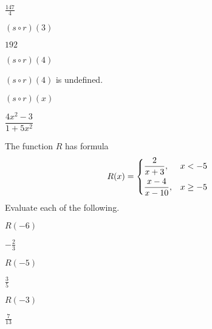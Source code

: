 \begin{exercises}
\begin{problem}[Composition]
\begin{multicols}{3}
\begin{subproblem}
 		\begin{shortsolution}
 			$\frac{147}{4}$ 
 		\end{shortsolution}
 	\end{subproblem}
 	\begin{subproblem}
 		$(s\circ r)(3)$ 
 		\begin{shortsolution}
 			$192$ 
 		\end{shortsolution}
 	\end{subproblem}
 	\begin{subproblem}
 		$(s\circ r)(4)$ 
 		\begin{shortsolution}
 			$(s\circ r)(4)$ is undefined.
 		\end{shortsolution}
 	\end{subproblem}
 	\begin{subproblem}
 		$(s\circ r)(x)$ 
 		\begin{shortsolution}
 			$\dfrac{4x^2-3}{1+5x^2}$
 		\end{shortsolution}
 	\end{subproblem}
 \end{multicols}
 \end{problem}
 \begin{problem}
 The function $R$ has formula
 \[
 	R(x)=
 	\begin{dcases}
 		\frac{2}{x+3},    & x<-5     \\
 		\frac{x-4}{x-10}, & x\geq -5 
 	\end{dcases}
 \]
 Evaluate each of the following.
 \begin{multicols}{4}
 	\begin{subproblem}
 		$R(-6)$    
 		\begin{shortsolution}
 			$-\frac{2}{3}$ 
 		\end{shortsolution}
 	\end{subproblem}
 	\begin{subproblem}
 		$R(-5)$ 
 		\begin{shortsolution}
 			$\frac{3}{5}$ 
 		\end{shortsolution}
 	\end{subproblem}
 	\begin{subproblem}
 		$R(-3)$ 
 		\begin{shortsolution}
 			$\frac{7}{13}$ 
 		\end{shortsolution}
 	\end{subproblem}

\end{multicols}
\end{problem}
\end{exercises}
